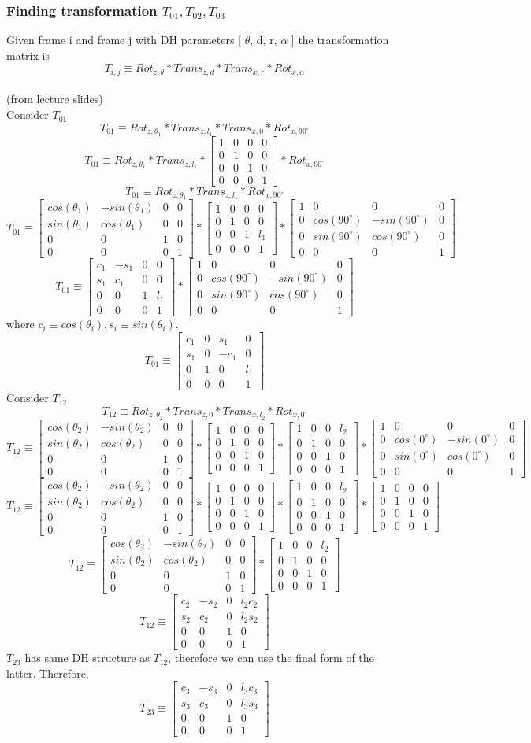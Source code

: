 \documentclass[12pt]{article}
\newcommand{\fromlectures}{{\\ \color{blue} \hspace*{\fill}(from lecture slides)} \\}
\newcommand{\rx}[1]{\begin{bmatrix} 1 & 0 & 0 & 0 \\ 0 & cos(#1) & -sin(#1) & 0 \\ 0 & sin(#1) & cos(#1) & 0 \\ 0 & 0 & 0 & 1 \end{bmatrix}}
\newcommand{\rz}[1]{\begin{bmatrix} cos(#1) & -sin(#1) & 0 & 0 \\ sin(#1) & cos(#1) & 0 & 0 \\ 0 & 0 & 1 & 0 \\ 0 & 0 & 0 & 1 \end{bmatrix}}
\newcommand{\iden}{\begin{bmatrix} 1 & 0 & 0 & 0 \\ 0 & 1 & 0 & 0 \\ 0 & 0 & 1 & 0 \\ 0 & 0 & 0 & 1 \end{bmatrix}}
\newcommand{\trans}[3]{\begin{bmatrix} 1 & 0 & 0 & #1 \\ 0 & 1 & 0 & #2 \\ 0 & 0 & 1 & #3 \\ 0 & 0 & 0 & 1 \end{bmatrix}}
\begin{document}
\subsubsection*{Finding transformation $T_{01}, T_{02}, T_{03}$}
Given frame i and frame j with DH parameters [ $\theta$, d, r, $\alpha$ ] the transformation matrix is
\[
  T_{i,j} \equiv Rot_{z,\theta} * Trans_{z, d} * Trans_{x, r} * Rot_{x, \alpha}
\]
\fromlectures
Consider $T_{01}$
\[
  T_{01} \equiv Rot_{z,\theta_1} * Trans_{z, l_1} * Trans_{x, 0} * Rot_{x, 90^{\circ}}
\]
\[
  T_{01} \equiv Rot_{z,\theta_1} * Trans_{z, l_1} * \iden * Rot_{x, 90^{\circ}}
\]
\[
  T_{01} \equiv Rot_{z,\theta_1} * Trans_{z, l_1} * Rot_{x, 90^{\circ}}
\]
\[
  T_{01} \equiv \rz{\theta_1} * \trans{0}{0}{l_1} * \rx{90^{\circ}}
\]
\[
  T_{01} \equiv
  \begin{bmatrix}
    c_1 & -s_1 & 0 & 0 \\
    s_1 & c_1 & 0 & 0 \\
    0 & 0 & 1 & l_1 \\
    0 & 0 & 0 & 1
  \end{bmatrix} * \rx{90^{\circ}}
\]
where $c_i \equiv cos(\theta_i), s_i \equiv sin(\theta_i)$.
\[
  T_{01} \equiv
  \begin{bmatrix}
    c_1 & 0 & s_1 & 0 \\
    s_1 & 0 & -c_1 & 0 \\
    0 & 1 & 0 & l_1 \\
    0 & 0 & 0 & 1
  \end{bmatrix}
\]
Consider $T_{12}$
\[
  T_{12} \equiv Rot_{z,\theta_2} * Trans_{z, 0} * Trans_{x, l_2} * Rot_{x, 0^{\circ}}
\]
\[
  T_{12} \equiv \rz{\theta_2} * \iden * \trans{l_2}{0}{0} * \rx{0^{\circ}}
\]
\[
  T_{12} \equiv \rz{\theta_2} * \iden * \trans{l_2}{0}{0} * \iden
\]
\[
  T_{12} \equiv \rz{\theta_2} * \trans{l_2}{0}{0}
\]
\[
  T_{12} \equiv
  \begin{bmatrix}
    c_2 & -s_2 & 0 & l_2c_2 \\
    s_2 & c_2 & 0 & l_2s_2 \\
    0 & 0 & 1 & 0 \\
    0 & 0 & 0 & 1
  \end{bmatrix}
\]
$T_{23}$ has same DH structure as $T_{12}$, therefore we can use the final form of the latter. Therefore,
\[
  T_{23} \equiv
  \begin{bmatrix}
    c_3 & -s_3 & 0 & l_3c_3 \\
    s_3 & c_3 & 0 & l_3s_3 \\
    0 & 0 & 1 & 0 \\
    0 & 0 & 0 & 1
  \end{bmatrix}
\]
\end{document}
